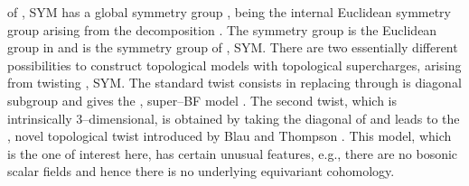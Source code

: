 \documentclass[a4paper,11pt]{article}
\begin{document}
of \coordHE{}, \coordHE{} SYM has a global symmetry group 
\coordHE{} \cite{17}, \coordHE{} being the 
internal Euclidean symmetry group arising from the decomposition 
\coordHE{}. The symmetry group \coordHE{} 
is the Euclidean group in \coordHE{} and \coordHE{} is the symmetry group
of \coordHE{}, \coordHE{} SYM. There are two essentially different 
possibilities to construct topological models with \coordHE{} topological
supercharges, arising from twisting \coordHE{}, \coordHE{} SYM. The standard twist 
consists in replacing \coordHE{} through is diagonal 
subgroup and gives the \coordHE{}, \coordHE{} super--BF model \cite{18}. The 
second twist, which is intrinsically 3--dimensional, is obtained by taking 
the diagonal of \coordHE{} and leads to the \coordHE{}, \coordHE{}
novel topological twist introduced by Blau and Thompson \cite{16}.
This model, which is the one of interest here, has certain unusual features, 
e.g., there are no bosonic scalar fields and hence there is no 
underlying equivariant cohomology. 
\end{document}
